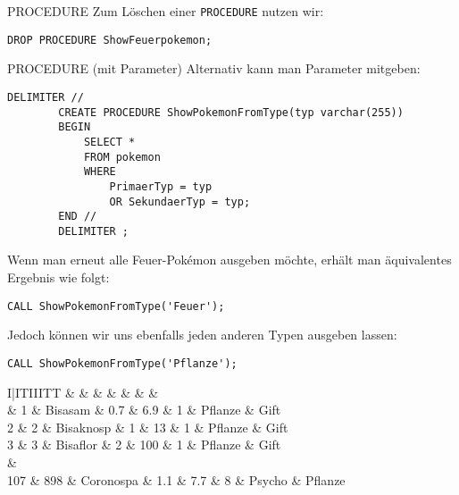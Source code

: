 \begin{sql}{PROCEDURE}
    Zum Löschen einer \texttt{PROCEDURE} nutzen wir:

    \begin{lstlisting}[language=mysql]
        DROP PROCEDURE ShowFeuerpokemon;
    \end{lstlisting}
\end{sql}

\begin{sql}{PROCEDURE (mit Parameter)}
    Alternativ kann man Parameter mitgeben:

    \begin{lstlisting}[language=mysql]
        DELIMITER //
        CREATE PROCEDURE ShowPokemonFromType(typ varchar(255))
        BEGIN
            SELECT *
            FROM pokemon
            WHERE
                PrimaerTyp = typ
                OR SekundaerTyp = typ;
        END //
        DELIMITER ;
    \end{lstlisting}

    Wenn man erneut alle Feuer-Pokémon ausgeben möchte, erhält man äquivalentes Ergebnis wie folgt:

    \begin{lstlisting}[language=mysql]
        CALL ShowPokemonFromType('Feuer');
    \end{lstlisting}

    Jedoch können wir uns ebenfalls jeden anderen Typen ausgeben lassen:

    \begin{lstlisting}[language=mysql]
        CALL ShowPokemonFromType('Pflanze');
    \end{lstlisting}

    \begin{tabular}{I|ITIIITT}
        &  &  &  &  &  &  &  \\ & 1 & Bisasam & 0.7 & 6.9 & 1 & Pflanze & Gift \\
        2 & 2 & Bisaknosp & 1 & 13 & 1 & Pflanze & Gift \\
        3 & 3 & Bisaflor & 2 & 100 & 1 & Pflanze & Gift \\
         &  \\
        107 & 898 & Coronospa & 1.1 & 7.7 & 8 & Psycho & Pflanze \\
    \end{tabular}


\end{sql}
